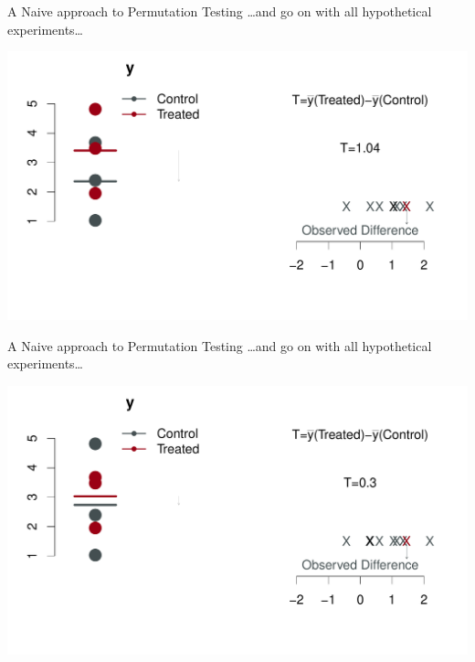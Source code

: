 \begin{frame}{A Naive approach to Permutation Testing}
\ldots and go on with all hypothetical experiments\ldots
\begin{center}
\includegraphics[width=1.1\textwidth]{figures/permsslides8} 
\end{center}
\end{frame}


\begin{frame}{A Naive approach to Permutation Testing} 
\ldots and go on with all hypothetical experiments\ldots
\begin{center}
\includegraphics[width=1.1\textwidth]{figures/permsslides9} 
\end{center}
\end{frame}


